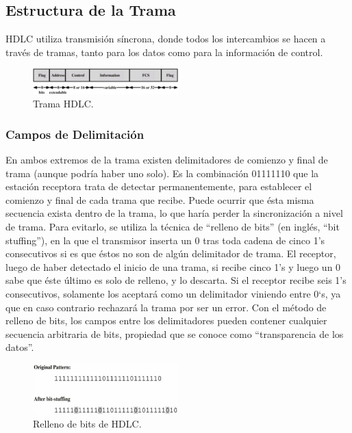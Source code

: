 \documentclass[withindex,glossary]{cam-thesis}
\begin{document}
\subsection{Estructura de la Trama}
HDLC utiliza transmisión síncrona, donde todos los intercambios se hacen a través de tramas, tanto para los datos como para la información de control.

\begin{figure}[H]
\centering
\includegraphics[width=0.5\textwidth]{images/HDLC_Frame}
\caption[Trama HDLC]{Trama HDLC.}
\end{figure}

\subsubsection{Campos de Delimitación}
En ambos extremos de la trama existen delimitadores de comienzo y final de trama (aunque podría haber uno solo). Es la combinación 01111110 que la estación receptora trata de detectar permanentemente, para establecer el comienzo y final de cada trama que recibe. Puede ocurrir que ésta misma secuencia exista dentro de la trama, lo que haría perder la sincronización a nivel de trama. Para evitarlo, se utiliza la técnica de “relleno de bits” (en inglés, “bit stuffing”), en la que el transmisor inserta un 0 tras toda cadena de cinco 1’s consecutivos si es que éstos no son de
algún delimitador de trama. El receptor, luego de haber detectado el inicio de una trama, si recibe cinco 1’s y luego un 0 sabe que éste último es solo de relleno, y lo descarta. Si el receptor recibe seis 1’s consecutivos, solamente los aceptará como un delimitador viniendo entre 0`s, ya que en caso contrario rechazará la trama por ser un error. Con el método de relleno de bits, los campos entre los delimitadores pueden contener cualquier secuencia arbitraria de bits, propiedad que se conoce como “transparencia de los datos”.

\begin{figure}[H]
\centering
\includegraphics[width=0.5\textwidth]{images/HDLC_BitStuffing}
\caption[Relleno de bits de HDLC]{Relleno de bits de HDLC.}
\end{figure}
\end{document}

